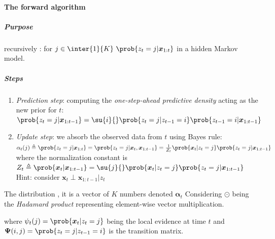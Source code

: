 \paragraph{The forward algorithm}
\subparagraph{Purpose} recursively : for $j\in\inter{1}{K}~
\prob{z_{t}=j|\bm{x}_{1:t}}$ in a hidden Markov model.
\subparagraph{Steps}
\begin{enumerate}
    \item \emph{Prediction step}: computing the \emph{one-step-ahead predictive 
        density} acting as the new prior for $t$:\\ $\prob{z_{t}=j|\bm{x}_{1:t-1}} =
        \su{i}{} \prob{z_{t}=j| z_{t-1}=i}\prob{z_{t-1}=i|\bm{x}_{1:t-1}}$
    \item \emph{Update step}: we absorb the observed data from $t$ using Bayes rule:\\
        $\alpha_{t}(j) \triangleq \prob{z_{t}=j| \bm{x}_{1:t}} = \prob{z_{
            t}=j| \bm{x}_{t}, \bm{x}_{1:t-1}} = \frac{1}{Z_{t}}\prob{\bm{x}_{
        t}|z_{t}=j} \prob{z_{t}=j|\bm{x}_{1:t-1}}$ 
        where  the normalization constant is $Z_{t} \triangleq \prob{\bm{x}_{t}|
        \bm{x}_{1:t-1}}=\su{j}{}\prob{\bm{x}_{t}|z_{t}=j}\prob{z_{t}=j|\bm{x}_{1:t-1}}$\\
        Hint: consider $\bm{x}_{t}\perp\bm{x}_{1:t-1}|z_{t}$
\end{enumerate}
The distribution ,
it is a vector of $K$ numbers denoted $\bm{\alpha}_{t}$
Considering $\odot$ being the \emph{Hadamard product} representing element-wise vector 
multiplication.
\begin{center}
\end{center}
where $\psi_{t}(j) = \prob{\bm{x}_{t}|z_{t}=j}$ being the local evidence at time $t$ and $\bm{\Psi}(
i,j)=\prob{z_{t}=j|z_{t-1}=i}$ is the transition matrix.

